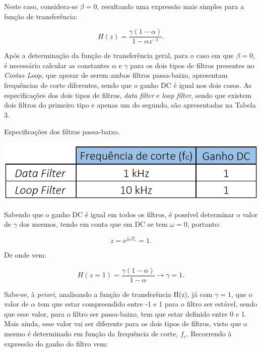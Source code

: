 \documentclass[11pt]{article}
\numberwithin{equation}{section}
\begin{document}
\vspace{1mm}
Neste caso, considera-se $\beta=0$, resultando uma expressão mais simples para a função de transferência:
 
\vspace{-3mm}
\begin{equation}
H(z) = \frac{\gamma(1-\alpha)}{1-\alpha z^{-1}}.
\end{equation} 

\vspace{1mm}
Após a determinação da função de transferência geral, para o caso em que $\beta = 0$, é necessário calcular as constantes $\alpha$ e $\gamma$ para os dois tipos de filtros presentes no \textit{Costas Loop}, que apesar de serem ambos filtros passa-baixo, apresentam frequências de corte diferentes, sendo que o ganho DC é igual nos dois casos. As especificações dos dois tipos de filtros, \textit{data filter} e \textit{loop filter}, sendo que existem dois filtros do primeiro tipo e apenas um do segundo, são apresentadas na Tabela 3. 

\begin{table}[H]
 	\centering
 	\caption{Especificações dos filtros passa-baixo.}
 	\vspace{-1.5mm}
 	\includegraphics[keepaspectratio=true, scale=0.35]{tabelas/especificacoes}
\end{table}

Sabendo que o ganho DC é igual em todos os filtros, é possível determinar o valor de $\gamma$ dos mesmos, tendo em conta que em DC se tem $\omega = 0$, portanto:

\vspace{-3mm}
\begin{equation}
	z = e^{j \omega T_s} = 1.
\end{equation}

\vspace{1mm}
De onde vem:

\vspace{-3mm}
\begin{equation}
	H(z = 1) = \frac{\gamma(1-\alpha)}{1-\alpha} \longrightarrow \gamma = 1.
\end{equation} 

\vspace{1mm}
Sabe-se, à \textit{priori}, analisando a função de transferência H(z), já com $\gamma = 1$, que o valor de $\alpha$ tem que estar compreendido entre -1 e 1 para o filtro ser estável, sendo que esse valor, para o filtro ser passa-baixo, tem que estar definido entre 0 e 1. Mais ainda, esse valor vai ser diferente para os dois tipos de filtros, visto que o mesmo é determinado em função da frequência de corte, \textit{$f_c$}. Recorrendo à expressão do ganho do filtro vem:
\end{document}
